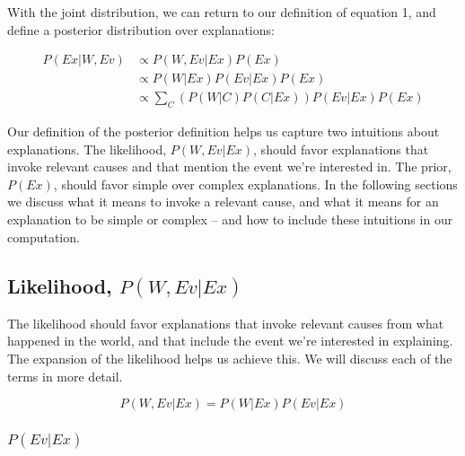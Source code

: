 \documentclass[11pt,a4paper]{article}
\begin{document}
With the joint distribution, we can return to our definition of equation 1, and define a posterior distribution over explanations:

\begin{equation}
\begin{split}
P(Ex|W,Ev) & \propto P(W,Ev|Ex)P(Ex)\\ 
		& \propto P(W|Ex)P(Ev|Ex)P(Ex)\\
		& \propto \sum_{C} (P(W|C)P(C|Ex))P(Ev|Ex)P(Ex)
\end{split}
\end{equation}


Our definition of the posterior definition helps us capture two intuitions about explanations. The likelihood, $P(W,Ev|Ex)$, should favor explanations that invoke relevant causes and that mention the event we're interested in. The prior, $P(Ex)$,  should favor simple over complex explanations. In the following sections we discuss what it means to invoke a relevant cause, and what it means for an explanation to be simple or complex -- and how to include these intuitions in our computation.

\subsection{Likelihood, $P(W,Ev|Ex)$}

The likelihood should favor explanations that invoke relevant causes from what happened in the world, and that include the event we're interested in explaining. The expansion of the likelihood helps us achieve this. We will discuss each of the terms in more detail.

\begin{equation}
P(W,Ev|Ex) = P(W|Ex)P(Ev|Ex)
\end{equation}

\subsubsection{$P(Ev|Ex)$}
\end{document}
